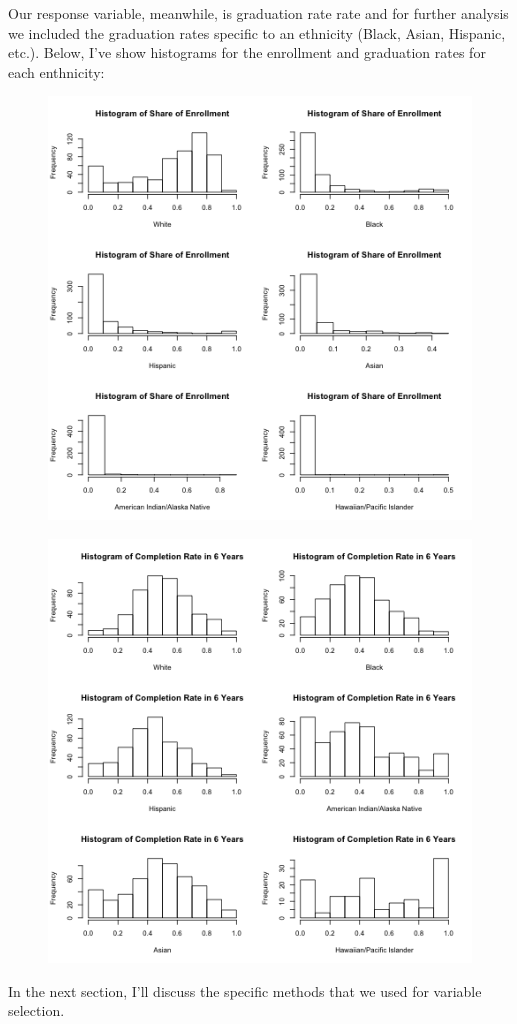 \documentclass{article}
\begin{document}
Our response variable, meanwhile, is graduation rate rate and for further analysis we included the graduation rates specific to an ethnicity (Black, Asian, Hispanic, etc.). Below, I've show histograms for the enrollment and graduation rates for each enthnicity:

\begin{figure}
\includegraphics{../../images/histogram_race_enrollment.png}
\end{figure}

\begin{figure}
\includegraphics{../../images/histogram_race_completion.png}
\end{figure}

In the next section, I'll discuss the specific methods that we used for variable selection.
\end{document}
